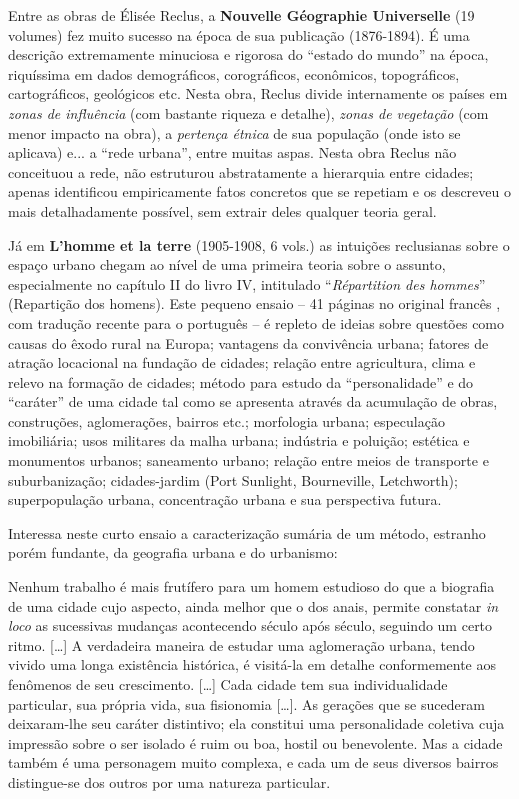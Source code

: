Entre as obras de Élisée Reclus, a \textbf{Nouvelle Géographie Universelle }(19 volumes) fez muito sucesso na época de sua publicação (1876-1894). É uma descrição extremamente minuciosa e rigorosa do ``estado do mundo'' na época, riquíssima em dados demográficos, corográficos, econômicos, topográficos, cartográficos, geológicos etc. Nesta obra, Reclus divide internamente os países em \textit{zonas de influência }(com bastante riqueza e detalhe), \textit{zonas de vegetação }(com menor impacto na obra), a \textit{pertença étnica }de sua população (onde isto se aplicava) e... a ``rede urbana'', entre muitas aspas. Nesta obra Reclus não conceituou a rede, não estruturou abstratamente a hierarquia  entre cidades; apenas identificou empiricamente fatos concretos que se repetiam e os descreveu o mais detalhadamente possível, sem extrair deles qualquer teoria geral.

Já em \textbf{L'homme et la terre} (1905-1908, 6 vols.) as intuições reclusianas sobre o espaço urbano chegam ao nível de uma primeira teoria sobre o assunto, especialmente no capítulo II do livro IV, intitulado ``\textit{Répartition des hommes}'' (Repartição dos homens). Este pequeno ensaio -- 41 páginas no original francês \cite[pp.~335-376]{RECLUS1905e}, com tradução recente para o português \cite{reclus_renovacao_2010} -- é repleto de ideias sobre questões como causas do êxodo rural na Europa; vantagens da convivência urbana; fatores de atração locacional na fundação de cidades; relação entre agricultura, clima e relevo na formação de cidades; método para estudo da ``personalidade'' e do ``caráter'' de uma cidade tal como se apresenta através da acumulação de obras, construções, aglomerações, bairros etc.; morfologia urbana; especulação imobiliária; usos militares da malha urbana; indústria e poluição; estética e monumentos urbanos; saneamento urbano; relação entre meios de transporte e suburbanização; cidades-jardim (Port Sunlight, Bourneville, Letchworth); superpopulação urbana, concentração urbana e sua perspectiva futura.

Interessa neste curto ensaio a caracterização sumária de um método, estranho porém fundante, da geografia urbana e do urbanismo:

\begin{citacao}
Nenhum trabalho é mais frutífero para um homem estudioso do que a biografia de uma cidade cujo aspecto, ainda melhor que o dos anais, permite constatar \textit{in loco} as sucessivas mudanças acontecendo século após século, seguindo um certo ritmo. [\dots] A verdadeira maneira de estudar uma aglomeração urbana, tendo vivido uma longa existência histórica, é visitá-la em detalhe conformemente aos fenômenos de seu crescimento. [\dots] Cada cidade tem sua individualidade particular, sua própria vida, sua fisionomia [\dots]. As gerações que se sucederam deixaram-lhe seu caráter distintivo; ela constitui uma personalidade coletiva cuja impressão sobre o ser isolado é ruim ou boa, hostil ou benevolente. Mas a cidade também é uma personagem muito complexa, e cada um de seus diversos bairros distingue-se dos outros por uma natureza particular. \cite[pp.~51-53]{reclus_renovacao_2010}
\end{citacao}

